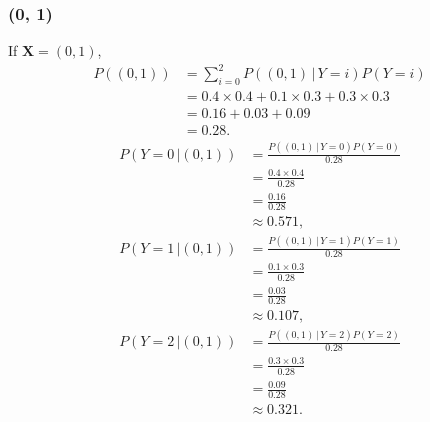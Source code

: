 \documentclass[10pt]{article}
\begin{document}
\subsubsection*{(0, 1)}
If $\textbf{X} = (0,1)$, 
\begin{align*}
P((0, 1)) &= \sum_{i = 0}^2 P((0, 1) \, | \, Y = i)P(Y = i) \\
             &= 0.4 \times 0.4 + 0.1 \times 0.3 + 0.3 \times 0.3 \\
             &= 0.16 + 0.03 + 0.09 \\
             &= 0.28.
\end{align*}
\begin{align*}
P(Y = 0 \, | (0,1)) &= \frac{P((0, 1) \, | \, Y = 0)P(Y = 0)}{ 0.28 } \\
                           &= \frac{0.4 \times 0.4}{ 0.28 } \\
                           &= \frac{0.16}{ 0.28 } \\
                           &\approx 0.571,
\end{align*}
\begin{align*}
P(Y = 1 \, | (0,1)) &= \frac{P((0, 1) \, | \, Y = 1)P(Y = 1)}{ 0.28 } \\
                           &= \frac{0.1 \times 0.3}{ 0.28 } \\
                           &= \frac{0.03 }{ 0.28 } \\
                           &\approx 0.107,
\end{align*}
\begin{align*}
P(Y = 2 \, | (0,1)) &= \frac{P((0, 1) \, | \, Y = 2)P(Y = 2)}{ 0.28 } \\
                           &= \frac{ 0.3 \times 0.3 }{ 0.28 } \\
                           &= \frac{ 0.09 }{ 0.28 } \\
                           &\approx 0.321.
\end{align*}
\end{document}
